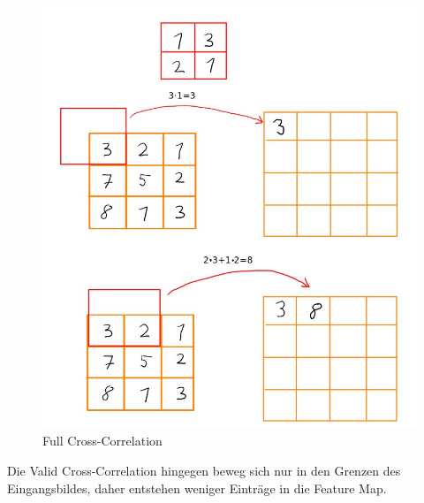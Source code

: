 \documentclass[12pt]{article}
\begin{document}
\begin{figure}[H]
\centering
\includegraphics[scale=0.5]{./Images/Full_Correlation_004.jpg}
\caption{Full Cross-Correlation}
\label{Full Correlation}
\end{figure}
 
Die Valid Cross-Correlation hingegen beweg sich nur in den Grenzen des Eingangsbildes, daher entstehen weniger Einträge in die Feature Map.
\end{document}
